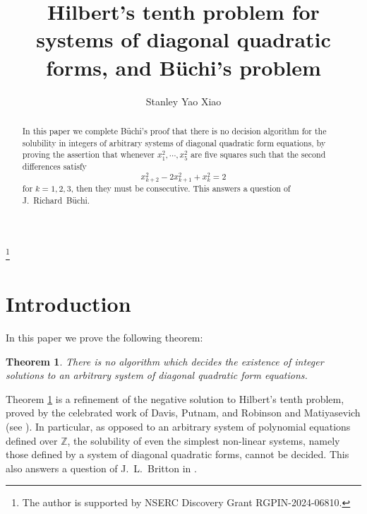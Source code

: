 \documentclass[letterpaper,10pt]{amsart}
\newcommand{\bZ}{{\mathbb{Z}}}
\newtheorem{theorem}{Theorem}[section]
\theoremstyle{definition}
\numberwithin{equation}{section}
\begin{document}
	
	\title{Hilbert's tenth problem for systems of diagonal quadratic forms, and B\"{u}chi's problem}
	\thanks{The author is supported by NSERC Discovery Grant RGPIN-2024-06810.} 
		
		\author{Stanley Yao Xiao}
	\address{Department of Mathematics and Statistics \\
		University of Northern British Columbia \\
		3333 University Way \\
		Prince George, British Columbia, Canada \\  V2N 4Z9}
	\indent
	
	
	\begin{abstract} In this paper we complete B\"{u}chi's proof that there is no decision algorithm for the solubility in integers of arbitrary systems of diagonal quadratic form equations, by proving the assertion that whenever $x_1^2, \cdots, x_5^2$ are five squares such that the second differences satisfy
	\[x_{k+2}^2 - 2 x_{k+1}^2 + x_k^2 = 2\]
	for $k = 1,2,3$, then they must be consecutive. This answers a question of J.~Richard~B\"{u}chi. 
	\end{abstract}
	
	\maketitle
	
	
	
	\section{Introduction}
	\label{Intro}


	
	In this paper we prove the following theorem:
	
	\begin{theorem} \label{maincor} There is no algorithm which decides the existence of integer solutions to an arbitrary system of diagonal quadratic form equations. 
	\end{theorem}
	
	Theorem \ref{maincor} is a refinement of the negative solution to Hilbert's tenth problem, proved by the celebrated work of Davis, Putnam, and Robinson and Matiyasevich (see \cite{DMR}). In particular, as opposed to an arbitrary system of polynomial equations defined over $\bZ$, the solubility of even the simplest non-linear systems, namely those defined by a system of diagonal quadratic forms, cannot be decided. This also answers a question of J.~L.~Britton in \cite{Bri}. \\
	
\end{document}
